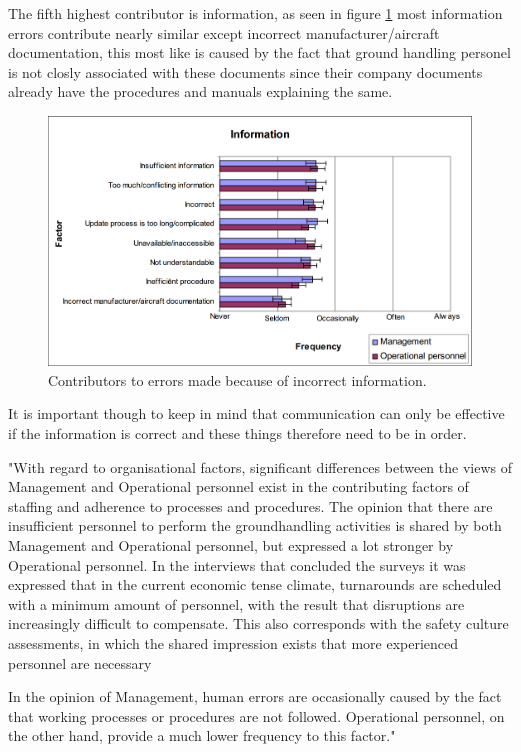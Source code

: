 The fifth highest contributor is information, as seen in figure \ref{Information} most information errors contribute nearly similar except  incorrect manufacturer/aircraft documentation, this most like is caused by the fact that ground handling personel is not closly associated with these documents since their company documents already have the procedures and manuals explaining the same.

\begin{figure}[!h]
\centering
\includegraphics[width=\textwidth]{Grafik/Information}
\caption{Contributors to errors made because of incorrect information.}
\label{Information}
\end{figure}

It is important though to keep in mind that communication can only be effective if the information is correct and these things therefore need to be in order.

"With regard to organisational factors, significant differences between the views of Management and Operational personnel exist in the contributing factors of staffing and adherence to processes and procedures. The opinion that there are insufficient personnel to perform the groundhandling activities is shared by both Management and Operational personnel, but expressed a lot stronger by Operational personnel. In the interviews that concluded the surveys it was expressed that in the current economic tense climate, turnarounds are scheduled with a minimum amount of personnel, with the result that disruptions are increasingly difficult to compensate. This also corresponds with the safety culture assessments, in which the shared impression exists that more experienced personnel are necessary

In the opinion of Management, human errors are occasionally caused by the fact that working processes or procedures are not followed. Operational personnel, on the other hand, provide a much lower frequency to this factor."

